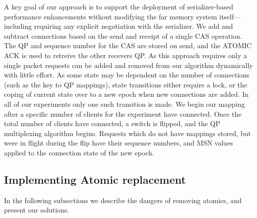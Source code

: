 A key goal of our approach is to support the deployment of
serializer-based performance enhancements without modifying the far
memory system itself---including requiring any explicit negotiation
with the serializer.
We add and subtract connections based on the send
and receipt of a single CAS operation. The QP and sequence number for
the CAS are stored on send, and the ATOMIC ACK is used to retreive the
other recevers QP. As this approach requires only a single packet
requests can be added and removed from our algorithm dynamically with
little effort. As some state may be dependent on the number of
connections (such as the key to QP mappings), state transitions either
require a lock, or the coping of current state over to a new epoch
when new connections are added. In all of our experiments only one
such transition is made. We begin our mapping after a specific number
of clients for the experiment have connected. Once the total number of
clients have connected, a switch is flipped, and the QP multiplexing
algorithm begins. Requests which do not have mappings stored, but were
in flight during the flip have their sequence numbers, and MSN values
applied to the connection state of the new epoch.





\subsection{Implementing Atomic replacement}

In the
following subsections we describe the dangers of removing atomics, and present
our solutions.

